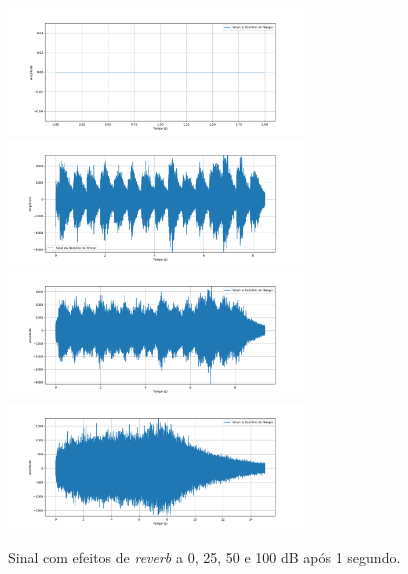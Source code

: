 \begin{figure}[h]
    \centering
    \includegraphics[width=0.7\textwidth]{figuras/fig70.png}
    \includegraphics[width=0.7\textwidth]{figuras/fig71.png}
    \includegraphics[width=0.7\textwidth]{figuras/fig72.png}
    \includegraphics[width=0.7\textwidth]{figuras/fig73.png}
    \caption{Sinal com efeitos de \textit{reverb} a 0, 25, 50 e 100 dB após 1 segundo.}
    \label{fig70}
\end{figure}



